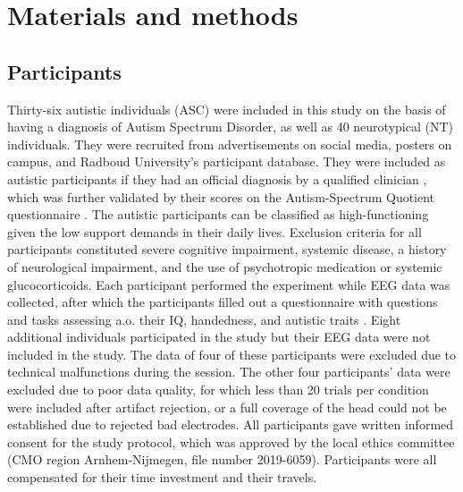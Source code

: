 \section{Materials and methods}

\subsection{Participants}
Thirty-six autistic individuals (ASC) were included in this study on the basis of having a diagnosis of Autism Spectrum Disorder, as well as 40 neurotypical (NT) individuals. They were recruited from advertisements on social media, posters on campus, and Radboud University's participant database. They were included as autistic participants if they had an official diagnosis by a qualified clinician \citep{apa2013}, which was further validated by their scores on the Autism-Spectrum Quotient questionnaire \citep[AQ]{baron-cohen2001AQ}. The autistic participants can be classified as high-functioning given the low support demands in their daily lives. Exclusion criteria for all participants constituted severe cognitive impairment, systemic disease, a history of neurological impairment, and the use of psychotropic medication or systemic glucocorticoids. Each participant performed the experiment while EEG data was collected, after which the participants filled out a questionnaire with questions and tasks assessing a.o. their IQ, handedness, and autistic traits \citep{baron-cohen2001AQ,raven1989,veale2014}. Eight additional individuals participated in the study but their EEG data were not included in the study. The data of four of these participants were excluded due to technical malfunctions during the session. The other four participants' data were excluded due to poor data quality, for which less than 20 trials per condition were included after artifact rejection, or a full coverage of the head could not be established due to rejected bad electrodes. All participants gave written informed consent for the study protocol, which was approved by the local ethics committee (CMO region Arnhem-Nijmegen, file number 2019-6059). Participants were all compensated for their time investment and their travels.

